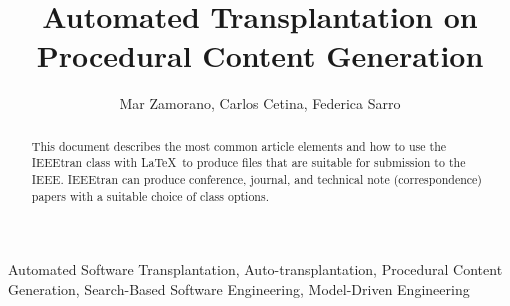\documentclass[lettersize,journal]{IEEEtran}
\title{Automated Transplantation on Procedural Content Generation}
\author{Mar Zamorano, Carlos Cetina, Federica Sarro}
\begin{document}
\maketitle

\begin{abstract}
This document describes the most common article elements and how to use the IEEEtran class with \LaTeX \ to produce files that are suitable for submission to the IEEE.  IEEEtran can produce conference, journal, and technical note (correspondence) papers with a suitable choice of class options. 
\end{abstract}

\begin{IEEEkeywords}
Automated Software Transplantation, Auto-transplantation, Procedural Content Generation, Search-Based Software Engineering, Model-Driven Engineering
\end{IEEEkeywords}














\end{document}
